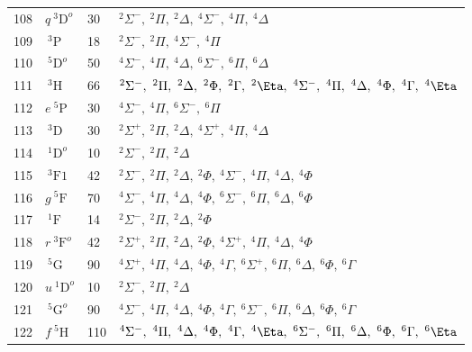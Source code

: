 \begin{table*}[]
\begin{tabular*}{\textwidth}{llll@{\extracolsep{\fill}}}
108 & $ q~^3\mathrm{D}^o $ &   30& $   ^{2}\Sigma^-,\  ^{2}\Pi,\     ^{2}\Delta,\   ^{4}\Sigma^-,\  ^{4}\Pi,\     ^{4}\Delta$ \\
109 & $    ~^3\mathrm{P} $ &   18& $   ^{2}\Sigma^-,\  ^{2}\Pi,\   ^{4}\Sigma^-,\  ^{4}\Pi$ \\
110 & $  ~^5\mathrm{D}^o $ &   50& $   ^{4}\Sigma^-,\  ^{4}\Pi,\     ^{4}\Delta,\   ^{6}\Sigma^-,\  ^{6}\Pi,\     ^{6}\Delta$ \\
111 & $    ~^3\mathrm{H} $ &   66& $   ^{2}\Sigma^-,\  ^{2}\Pi,\     ^{2}\Delta,\ ^{2}\Phi,\     ^{2}\Gamma,\ ^{2}\Eta,\   ^{4}\Sigma^-,\  ^{4}\Pi,\     ^{4}\Delta,\ ^{4}\Phi,\     ^{4}\Gamma,\ ^{4}\Eta$ \\
112 & $   e~^5\mathrm{P} $ &   30& $   ^{4}\Sigma^-,\  ^{4}\Pi,\   ^{6}\Sigma^-,\  ^{6}\Pi$ \\
113 & $    ~^3\mathrm{D} $ &   30& $   ^{2}\Sigma^+,\  ^{2}\Pi,\     ^{2}\Delta,\   ^{4}\Sigma^+,\  ^{4}\Pi,\     ^{4}\Delta$ \\
114 & $  ~^1\mathrm{D}^o $ &   10& $   ^{2}\Sigma^-,\  ^{2}\Pi,\     ^{2}\Delta$ \\
115 & $   ~^3\mathrm{F1} $ &   42& $   ^{2}\Sigma^-,\  ^{2}\Pi,\     ^{2}\Delta,\ ^{2}\Phi,\   ^{4}\Sigma^-,\  ^{4}\Pi,\     ^{4}\Delta,\ ^{4}\Phi$ \\
116 & $   g~^5\mathrm{F} $ &   70& $   ^{4}\Sigma^-,\  ^{4}\Pi,\     ^{4}\Delta,\ ^{4}\Phi,\   ^{6}\Sigma^-,\  ^{6}\Pi,\     ^{6}\Delta,\ ^{6}\Phi$ \\
117 & $    ~^1\mathrm{F} $ &   14& $   ^{2}\Sigma^-,\  ^{2}\Pi,\     ^{2}\Delta,\ ^{2}\Phi$ \\
118 & $ r~^3\mathrm{F}^o $ &   42& $   ^{2}\Sigma^+,\  ^{2}\Pi,\     ^{2}\Delta,\ ^{2}\Phi,\   ^{4}\Sigma^+,\  ^{4}\Pi,\     ^{4}\Delta,\ ^{4}\Phi$ \\
119 & $    ~^5\mathrm{G} $ &   90& $   ^{4}\Sigma^+,\  ^{4}\Pi,\     ^{4}\Delta,\ ^{4}\Phi,\     ^{4}\Gamma,\   ^{6}\Sigma^+,\  ^{6}\Pi,\     ^{6}\Delta,\ ^{6}\Phi,\     ^{6}\Gamma$ \\
120 & $ u~^1\mathrm{D}^o $ &   10& $   ^{2}\Sigma^-,\  ^{2}\Pi,\     ^{2}\Delta$ \\
121 & $  ~^5\mathrm{G}^o $ &   90& $   ^{4}\Sigma^-,\  ^{4}\Pi,\     ^{4}\Delta,\ ^{4}\Phi,\     ^{4}\Gamma,\   ^{6}\Sigma^-,\  ^{6}\Pi,\     ^{6}\Delta,\ ^{6}\Phi,\     ^{6}\Gamma$ \\
122 & $   f~^5\mathrm{H} $ &  110& $   ^{4}\Sigma^-,\  ^{4}\Pi,\     ^{4}\Delta,\ ^{4}\Phi,\     ^{4}\Gamma,\ ^{4}\Eta,\   ^{6}\Sigma^-,\  ^{6}\Pi,\     ^{6}\Delta,\ ^{6}\Phi,\     ^{6}\Gamma,\ ^{6}\Eta$ \\

\end{tabular*}
\end{table*}
